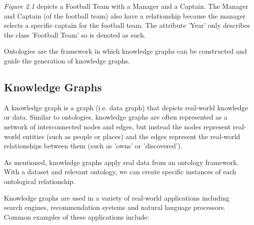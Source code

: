 \textit{Figure 2.1} depicts a Football Team with a Manager and a Captain. The Manager and Captain (of the football team) also have a relationship because the manager selects a specific captain for the football team. The attribute 'Year' only describes the class 'Football Team' so is denoted as such.

Ontologies are the framework in which knowledge graphs can be constructed and guide the generation of knowledge graphs. 

\subsection{Knowledge Graphs}
\hspace{0.5cm} A knowledge graph is a graph (i.e. data graph) that depicts real-world knowledge or data. \cite{knowledgegraph} Similar to ontologies, knowledge graphs are often represented as a network of interconnected nodes and edges, but instead the nodes represent real-world entities (such as people or places) and the edges represent the real-world relationships between them (such as 'owns' or 'discovered'). 

As mentioned, knowledge graphs apply real data from an ontology framework. With a dataset and relevant ontology, we can create specific instances of each ontological relationship. 

Knowledge graphs are used in a variety of real-world applications including search engines, recommendation systems and natural language processors. Common examples of these applications include:


